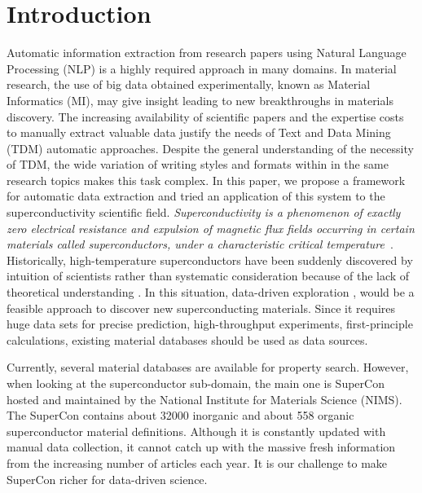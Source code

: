 \documentclass{article}[a4]
\begin{document}
\section{Introduction}
Automatic information extraction from research papers using Natural Language Processing (NLP) is a highly required approach in many domains. In material research, the use of big data obtained experimentally, known as Material Informatics (MI), may give insight leading to new breakthroughs in materials discovery. 
The increasing availability of scientific papers and the expertise costs to manually extract valuable data justify the needs of Text and Data Mining (TDM) automatic approaches. Despite the general understanding of the necessity of TDM, the wide variation of writing styles and formats within in the same research topics makes this task complex.
In this paper, we propose a framework for automatic data extraction and tried an application of this system to the superconductivity scientific field.
\textit{Superconductivity is a phenomenon of exactly zero electrical resistance and expulsion of magnetic flux fields occurring in certain materials called superconductors, under a characteristic critical temperature}~\cite{wikipedia:superconductivity}. 
Historically, high-temperature superconductors have been suddenly discovered by intuition of scientists rather than systematic consideration because of the lack of theoretical understanding \cite{klintenberg2013possible} \cite{DBLP:journals/corr/abs-1812-01995}. In this situation, data-driven exploration \cite{doi:10.1080/14686996.2018.1548885}, \cite{HAMIDIEH2018346} \cite{PhysRevMaterials.2.024802} \cite{doi:10.1021/cm503507h} would be a feasible approach to discover new superconducting materials. Since it requires huge data sets for precise prediction, high-throughput experiments, first-principle calculations, existing material databases should be used as data sources.

Currently, several material databases are available for property search. However, when looking at the superconductor sub-domain, the main one is SuperCon~\cite{SuperCon} hosted and maintained by the National Institute for Materials Science (NIMS). The SuperCon contains about 32000 inorganic and about 558 organic superconductor material definitions. Although it is constantly updated with manual data collection, it cannot catch up with the massive fresh information from the increasing number of articles each year. It is our challenge to make SuperCon richer for data-driven science.
\end{document}
